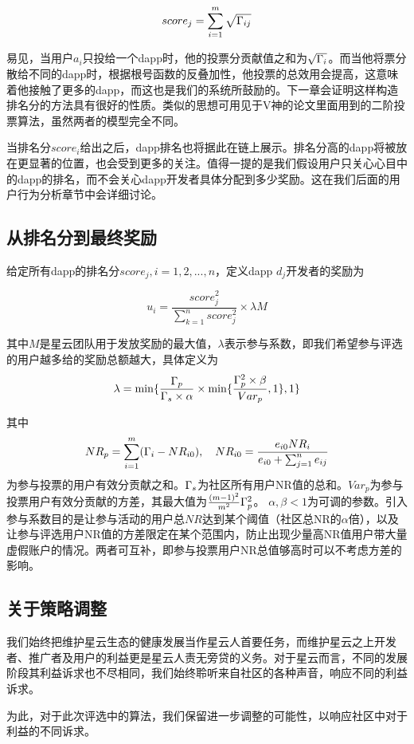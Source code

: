 $$score_j = \sum_{i=1}^m \sqrt{\Gamma_{ij}}$$

易见，当用户$a_i$只投给一个dapp时，他的投票分贡献值之和为$\sqrt{\Gamma_i}$。而当他将票分散给不同的dapp时，根据根号函数的反叠加性，他投票的总效用会提高，这意味着他接触了更多的dapp，而这也是我们的系统所鼓励的。下一章会证明这样构造排名分的方法具有很好的性质。类似的思想可用见于V神的论文\cite{buterin2018liberal}里面用到的二阶投票算法，虽然两者的模型完全不同。

当排名分$score_i$给出之后，dapp排名也将据此在链上展示。排名分高的dapp将被放在更显著的位置，也会受到更多的关注。值得一提的是我们假设用户只关心心目中的dapp的排名，而不会关心dapp开发者具体分配到多少奖励。这在我们后面的用户行为分析章节中会详细讨论。

\subsection{从排名分到最终奖励}
给定所有dapp的排名分$score_j,i=1,2,...,n$，定义dapp $d_j$开发者的奖励为

$$u_i = \frac{score_j^2}{\sum_{k=1}^n score_j^2}\times \lambda M$$

其中$M$是星云团队用于发放奖励的最大值，$\lambda $表示参与系数，即我们希望参与评选的用户越多给的奖励总额越大，具体定义为
$$\lambda=\min\{\frac{\Gamma_p}{\Gamma_s\times \alpha}\times \min\{\frac{\Gamma_p^2\times \beta}{Var_p},1\},1\}$$

其中$$NR_p = \sum_{i=1}^m (\Gamma_i-NR_{i0}),~~~NR_{i0} = \frac{e_{i0}NR_i}{e_{i0}+\sum_{j=1}^n {e_{ij}}}$$
为参与投票的用户有效分贡献之和。$\Gamma_s$为社区所有用户NR值的总和。$Var_p$为参与投票用户有效分贡献的方差，其最大值为$\frac{(m-1)^2}{m^2}\Gamma_p^2$。
$\alpha,\beta<1$为可调的参数。引入参与系数目的是让参与活动的用户总$NR$达到某个阈值（社区总NR的$\alpha$倍），以及让参与评选用户NR值的方差限定在某个范围内，防止出现少量高NR值用户带大量虚假账户的情况。两者可互补，即参与投票用户NR总值够高时可以不考虑方差的影响。
\subsection{关于策略调整}
我们始终把维护星云生态的健康发展当作星云人首要任务，而维护星云之上开发者、推广者及用户的利益更是星云人责无旁贷的义务。对于星云而言，不同的发展阶段其利益诉求也不尽相同，我们始终聆听来自社区的各种声音，响应不同的利益诉求。

为此，对于此次评选中的算法，我们保留进一步调整的可能性，以响应社区中对于利益的不同诉求。
